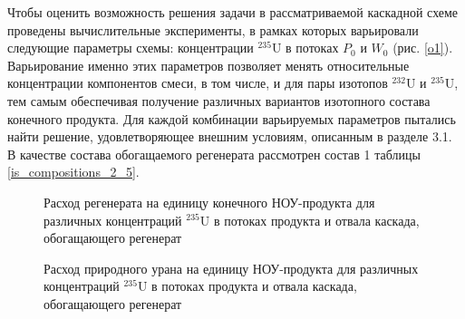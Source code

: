 Чтобы оценить возможность решения задачи в рассматриваемой каскадной схеме проведены вычислительные эксперименты, в рамках которых варьировали следующие параметры схемы: концентрации $^{235}$U в потоках $P_0$ и $W_0$ (рис. \ref{o1}). Варьирование именно этих параметров позволяет менять относительные концентрации компонентов смеси, в том числе, и для пары изотопов $^{232}$U и $^{235}$U, тем самым обеспечивая получение различных вариантов изотопного состава конечного продукта. Для каждой комбинации варьируемых параметров пытались найти решение, удовлетворяющее внешним условиям, описанным в разделе 3.1. В качестве состава обогащаемого регенерата рассмотрен состав 1 таблицы \ref{is_compositions_2_5}.  

\begin{figure}[ht]
  \caption{Расход регенерата на единицу конечного НОУ-продукта для различных концентраций $^{235}$U в потоках продукта и отвала каскада, обогащающего регенерат}\label{Figure_10}
\end{figure}

\begin{figure}[ht]
  \caption{Расход природного урана на единицу НОУ-продукта  для различных концентраций $^{235}$U в потоках продукта и отвала каскада, обогащающего регенерат}\label{fig:sc2_2}
\end{figure}

